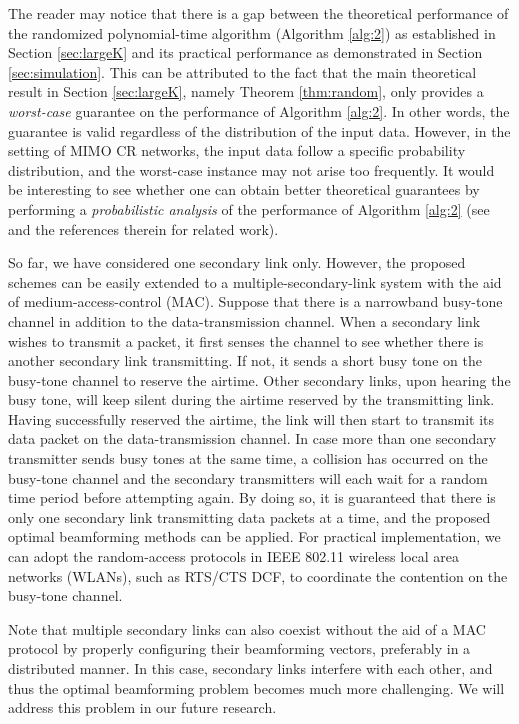 \documentclass[twocolumn,10pt]{IEEEtran}
\theoremstyle{plain} \newtheorem{theorem}{Theorem}
\theoremstyle{plain} \newtheorem{proposition}{Proposition}
\theoremstyle{plain} \newtheorem{corollary}{Corollary}
\theoremstyle{remark} \newtheorem{remark}{Remark}
\theoremstyle{remark} \newtheorem{lemma}{Lemma}
\theoremstyle{plain} \newtheorem{definition}{Definition}
\theoremstyle{plain} \newtheorem{assumption}{Assumption}
\theoremstyle{plain} \newtheorem{fact}{Fact}
\begin{document}
The reader may notice that there is a gap between the theoretical performance of the randomized polynomial-time algorithm (Algorithm \ref{alg:2}) as established in Section \ref{sec:largeK} and its practical performance as demonstrated in Section \ref{sec:simulation}.  This can be attributed to the fact that the main theoretical result in Section \ref{sec:largeK}, namely Theorem \ref{thm:random}, only provides a {\it worst-case} guarantee on the performance of Algorithm \ref{alg:2}.  In other words, the guarantee is valid regardless of the distribution of the input data.  However, in the setting of MIMO CR networks, the input data follow a specific probability distribution, and the worst-case instance may not arise too frequently.  It would be interesting to see whether one can obtain better theoretical guarantees by performing a {\it probabilistic analysis} of the performance of Algorithm \ref{alg:2} (see \cite{SY10} and the references therein for related work).

So far, we have considered one secondary link only. However, the proposed schemes can be easily extended to a multiple-secondary-link system with the aid of medium-access-control (MAC). Suppose that there is a narrowband busy-tone channel in addition to the data-transmission channel. When a secondary link wishes to transmit a packet, it first senses the channel to see whether there is another secondary link transmitting. If not, it sends a short busy tone on the busy-tone channel to reserve the airtime. Other secondary links, upon hearing the busy tone, will keep silent during the airtime reserved by the transmitting link. Having successfully reserved the airtime, the link will then start to transmit its data packet on the data-transmission channel. In case more than one secondary transmitter sends busy tones at the same time, a collision has occurred on the busy-tone channel and the secondary transmitters will each wait for a random time period before attempting again. By doing so, it is guaranteed that there is only one secondary link transmitting data packets at a time, and the proposed optimal beamforming methods can be applied. For practical implementation, we can adopt the random-access protocols in IEEE 802.11 wireless local area networks (WLANs), such as RTS/CTS DCF, to coordinate the contention on the busy-tone channel.

Note that multiple secondary links can also coexist without the aid of a MAC protocol by properly configuring their beamforming vectors, preferably in a distributed manner. In this case, secondary links interfere with each other, and thus the optimal beamforming problem becomes much more challenging. We will address this problem in our future research.



\end{document}
